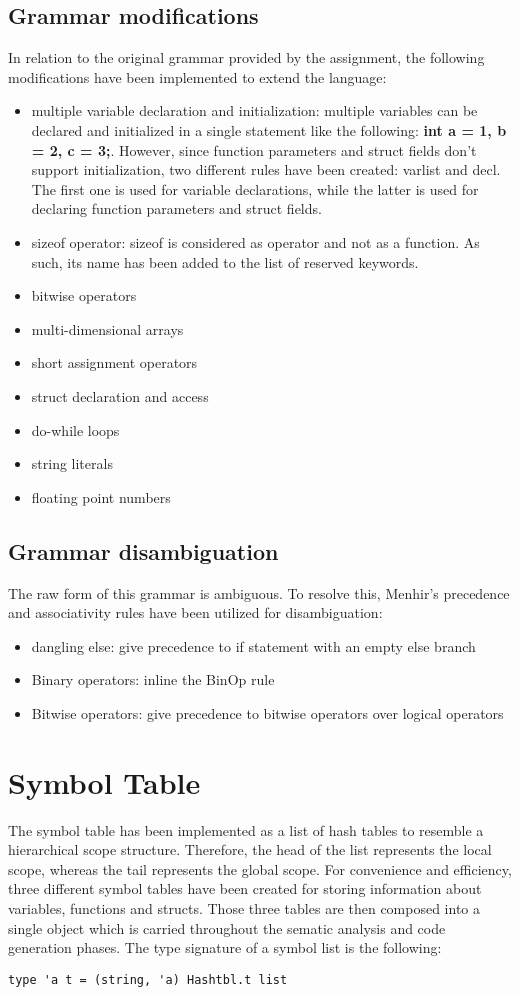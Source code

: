 \documentclass{article}
\begin{document}
\subsection*{Grammar modifications}
In relation to the original grammar provided by the assignment, the following modifications
have been implemented to extend the language:
\begin{itemize}
    \item multiple variable declaration and initialization: multiple variables can be declared and initialized in a single statement
    like the following: \textbf{int a = 1, b = 2, c = 3;}. However, since function parameters and struct fields don't support initialization,
    two different rules have been created: varlist and decl. The first one is used for variable declarations,
    while the latter is used for declaring function parameters and struct fields.
    \item sizeof operator: sizeof is considered as operator and not as a function. As such, its name has been added to the list of reserved keywords.
    \item bitwise operators
    \item multi-dimensional arrays
    \item short assignment operators
    \item struct declaration and access
    \item do-while loops
    \item string literals
    \item floating point numbers
\end{itemize}
\subsection*{Grammar disambiguation}
The raw form of this grammar is ambiguous.
To resolve this, Menhir's precedence and associativity rules have been utilized for disambiguation:
\begin{itemize}
  \item dangling else: give precedence to if statement with an empty else branch
  \item Binary operators: inline the BinOp rule
  \item Bitwise operators: give precedence to bitwise operators over logical operators
\end{itemize}

\section{Symbol Table}
The symbol table has been implemented as a list of hash tables to resemble a hierarchical scope structure.
Therefore, the head of the list represents the local scope, whereas the tail represents the global scope.
For convenience and efficiency, three different symbol tables have been created for storing information about variables, functions and structs.
Those three tables are then composed into a single object which is carried throughout the sematic analysis and code generation phases.
The type signature of a symbol list is the following:
\begin{lstlisting}
type 'a t = (string, 'a) Hashtbl.t list
\end{lstlisting}
\end{document}

